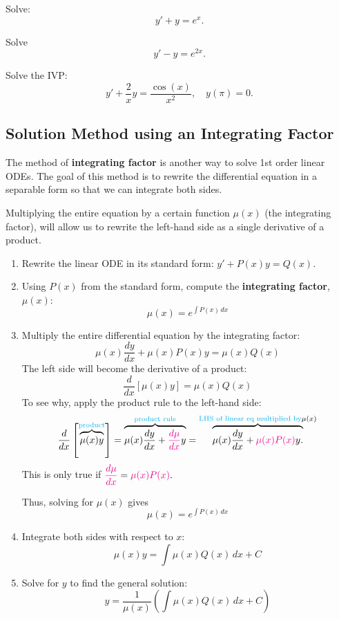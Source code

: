     \begin{question}
        Solve:
        \[
        y' + y = e^x.
        \]
    \end{question}

    \begin{question} Solve 
        \[
        y' - y = e^{2x}.
        \]
    \end{question}

    \begin{question}
        Solve the IVP:
        \[
        y' + \frac{2}{x}y = \frac{\cos(x)}{x^2}, \quad y(\pi) = 0.
        \]
    \end{question}


\subsection{Solution Method using an Integrating Factor}
The method of \textbf{integrating factor} is another way to solve 1st order linear ODEs.
The goal of this method is to rewrite the differential equation in a separable form so that we can integrate both sides.

\noindent Multiplying the entire equation by a certain function \(\mu(x)\) (the integrating factor),
will allow us to rewrite the left-hand side as a single derivative of a product.
    
    
\begin{enumerate}
    \item Rewrite the linear ODE in its standard form: \(y' + P(x)y = Q(x)\).
    
    \item Using \(P(x)\) from the standard form, compute the \textbf{integrating factor}, \(\mu(x)\):
     \[
     \mu(x) = e^{\int P(x) \, dx}
     \]
     
    \item Multiply the entire differential equation by the integrating factor:
    \[
    \mu(x)\dfrac{dy}{dx} + \mu(x)P(x)y = \mu(x)Q(x)
    \]
    The left side will become the derivative of a product:
    \[
    \dfrac{d}{dx}[\mu(x)y] = \mu(x)Q(x)
    \]
    To see why, apply the product rule to the left-hand side:
    \[
     \dfrac{d}{dx}\left[\overbrace{\mu(x)y}^{\text{\textcolor{cyan}{product}}}\right] = 
     \overbrace{\mu(x)\dfrac{dy}{dx} + \textcolor{magenta}{\dfrac{d\mu}{dx}}y}^{\text{\textcolor{cyan}{product rule}}} =
     \overbrace{\mu(x)\dfrac{dy}{dx} + \textcolor{magenta}{\mu(x) P(x)}y.}^{\text{\textcolor{cyan}{LHS of linear eq multiplied by}} \mu(x)}
    \]
    This is only true if
    \(
    \textcolor{magenta}{\dfrac{d\mu}{dx}} = \textcolor{magenta}{\mu(x)P(x)}.
    \)

    Thus, solving for \(\mu(x)\) gives 
    \[
     \mu(x) = e^{\int P(x) \, dx}
     \]
    
    \item Integrate both sides with respect to \(x\):
    \[
    \mu(x)y = \int \mu(x)Q(x) \, dx + C \]
    
    \item Solve for \(y\) to find the general solution:
    \[
    y = \frac{1}{\mu(x)} \left( \int \mu(x)Q(x) \, dx + C \right) 
    \]
\end{enumerate}


